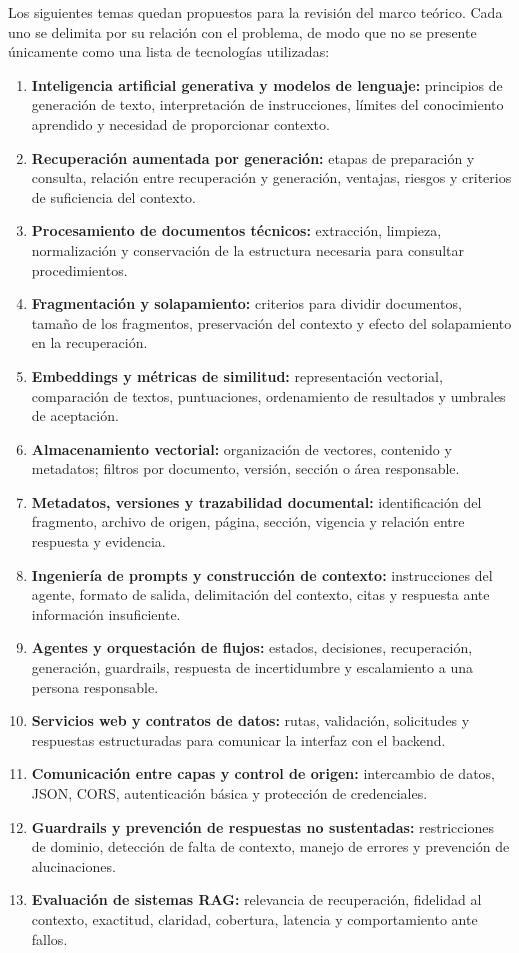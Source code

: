 Los siguientes temas quedan propuestos para la revisión del marco teórico. Cada uno se delimita por su relación con el problema, de modo que no se presente únicamente como una lista de tecnologías utilizadas:

\begin{enumerate}
    \item \textbf{Inteligencia artificial generativa y modelos de lenguaje:} principios de generación de texto, interpretación de instrucciones, límites del conocimiento aprendido y necesidad de proporcionar contexto.
    \item \textbf{Recuperación aumentada por generación:} etapas de preparación y consulta, relación entre recuperación y generación, ventajas, riesgos y criterios de suficiencia del contexto.
    \item \textbf{Procesamiento de documentos técnicos:} extracción, limpieza, normalización y conservación de la estructura necesaria para consultar procedimientos.
    \item \textbf{Fragmentación y solapamiento:} criterios para dividir documentos, tamaño de los fragmentos, preservación del contexto y efecto del solapamiento en la recuperación.
    \item \textbf{Embeddings y métricas de similitud:} representación vectorial, comparación de textos, puntuaciones, ordenamiento de resultados y umbrales de aceptación.
    \item \textbf{Almacenamiento vectorial:} organización de vectores, contenido y metadatos; filtros por documento, versión, sección o área responsable.
    \item \textbf{Metadatos, versiones y trazabilidad documental:} identificación del fragmento, archivo de origen, página, sección, vigencia y relación entre respuesta y evidencia.
    \item \textbf{Ingeniería de prompts y construcción de contexto:} instrucciones del agente, formato de salida, delimitación del contexto, citas y respuesta ante información insuficiente.
    \item \textbf{Agentes y orquestación de flujos:} estados, decisiones, recuperación, generación, guardrails, respuesta de incertidumbre y escalamiento a una persona responsable.
    \item \textbf{Servicios web y contratos de datos:} rutas, validación, solicitudes y respuestas estructuradas para comunicar la interfaz con el backend.
    \item \textbf{Comunicación entre capas y control de origen:} intercambio de datos, JSON, CORS, autenticación básica y protección de credenciales.
    \item \textbf{Guardrails y prevención de respuestas no sustentadas:} restricciones de dominio, detección de falta de contexto, manejo de errores y prevención de alucinaciones.
    \item \textbf{Evaluación de sistemas RAG:} relevancia de recuperación, fidelidad al contexto, exactitud, claridad, cobertura, latencia y comportamiento ante fallos.
\end{enumerate}

